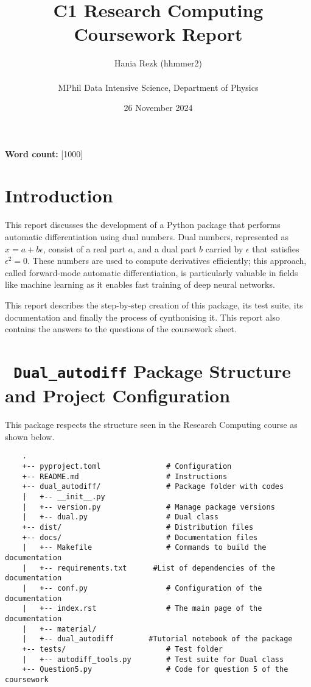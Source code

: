 \documentclass[a4paper,12pt]{article}
\title{\Huge \textbf{C1 Research Computing Coursework Report}}
\author{Hania Rezk (hhmmer2) \\ 
\\
MPhil Data Intensive Science, Department of Physics}
\date{26 November 2024}
\begin{document}
\maketitle


\noindent \textbf{Word count:} [1000] \\

\newpage  
\tableofcontents

\newpage  


\section{Introduction}
This report discusses the development of a Python package that performs automatic differentiation using dual numbers. Dual numbers, represented as $x = a + b\epsilon$, consist of a real part $a$, and a dual part $b$ carried by $\epsilon$ that satisfies $\epsilon^2 = 0$. These numbers are used to compute derivatives efficiently; this approach, called forward-mode automatic differentiation, is particularly valuable in fields like machine learning as it enables fast training of deep neural networks.

\vspace{10pt}

This report describes the step-by-step creation of this package, its test suite, its documentation and finally the process of cynthonising it. This report also contains the answers to the questions of the coursework sheet. 

\section{ \texttt{ Dual\_autodiff} Package Structure and Project Configuration}
This package respects the structure seen in the Research Computing course as shown below.

\begin{verbatim}
    .
    +-- pyproject.toml               # Configuration 
    +-- README.md                    # Instructions
    +-- dual_autodiff/               # Package folder with codes
    |   +-- __init__.py
    |   +-- version.py               # Manage package versions
    |   +-- dual.py                  # Dual class
    +-- dist/                        # Distribution files
    +-- docs/                        # Documentation files
    |   +-- Makefile                 # Commands to build the documentation
    |   +-- requirements.txt      #List of dependencies of the documentation        
    |   +-- conf.py                  # Configuration of the documentation
    |   +-- index.rst                # The main page of the documentation
    |   +-- material/  
    |   +-- dual_autodiff        #Tutorial notebook of the package              
    +-- tests/                       # Test folder
    |   +-- autodiff_tools.py        # Test suite for Dual class
    +-- Question5.py                 # Code for question 5 of the coursework
\end{verbatim}
\end{document}

